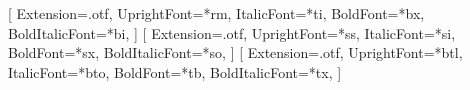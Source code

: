 \makeatletter
\g@addto@macro\@floatboxreset\centering
\makeatother

\usepackage{fontspec}
\setmainfont{cmun}[
Extension=.otf,
UprightFont=*rm,
ItalicFont=*ti,
BoldFont=*bx,
BoldItalicFont=*bi,
]
\setsansfont{cmun}[
Extension=.otf,
UprightFont=*ss,
ItalicFont=*si,
BoldFont=*sx,
BoldItalicFont=*so,
]
\setmonofont{cmun}[
Extension=.otf,
UprightFont=*btl,
ItalicFont=*bto,
BoldFont=*tb,
BoldItalicFont=*tx,
]
\usepackage{xltxtra}
\usepackage{xecyr}

\usepackage{lastpage}

\usepackage{custom}
